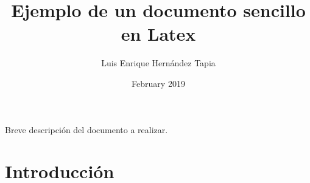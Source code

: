 \documentclass[12pt,latterpaper]{article}
\title{Ejemplo de un documento sencillo en Latex}
\author{Luis Enrique Hernández Tapia}
\date{February 2019}
\begin{document}
\maketitle %
Breve descripción del documento a realizar.
\section{Introducción}
\end{document}
